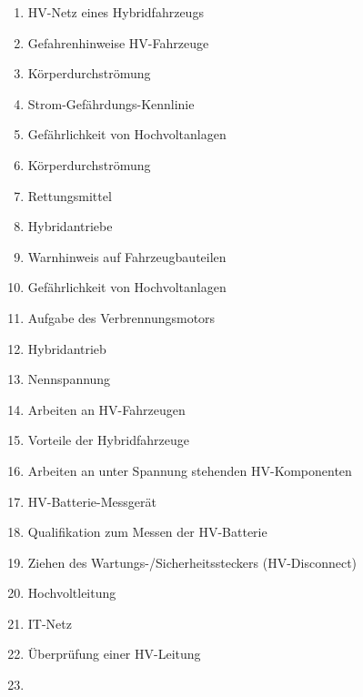 \begin{enumerate}
\item
  HV-Netz eines Hybridfahrzeugs\\
\item
  Gefahrenhinweise HV-Fahrzeuge\\
\item
  Körperdurchströmung\\
\item
  Strom-Gefährdungs-Kennlinie\\
\item
  Gefährlichkeit von Hochvoltanlagen\\
\item
  Körperdurchströmung\\
\item
  Rettungsmittel\\
\item
  Hybridantriebe\\
\item
  Warnhinweis auf Fahrzeugbauteilen\\
\item
  Gefährlichkeit von Hochvoltanlagen\\
\item
  Aufgabe des Verbrennungsmotors\\
\item
  Hybridantrieb\\
\item
  Nennspannung\\
\item
  Arbeiten an HV-Fahrzeugen\\
\item
  Vorteile der Hybridfahrzeuge\\
\item
  Arbeiten an unter Spannung stehenden HV-Komponenten\\
\item
  HV-Batterie-Messgerät\\
\item
  Qualifikation zum Messen der HV-Batterie\\
\item
  Ziehen des Wartungs-/Sicherheitssteckers (HV-Disconnect)\\
\item
  Hochvoltleitung\\
\item
  IT-Netz\\
\item
  Überprüfung einer HV-Leitung\\
\item

\end{enumerate}
